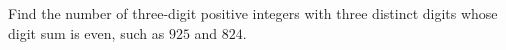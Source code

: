 Find the number of three-digit positive integers with three distinct digits whose digit sum is even, such as $925$ and $824$.
